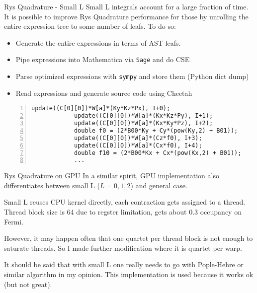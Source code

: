 \documentclass{beamer}
\begin{document}
\begin{frame}[fragile]{Rys Quadrature - Small L}
Small L integrals account for a large fraction of time.
It is possible to improve Rys Quadrature performance for those by
unrolling the entire expression tree to some number of leafs.
To do so:
\begin{itemize}
\item Generate the entire expressions in terms of AST leafs.
\item Pipe expressions into Mathematica via {\tt Sage} and do CSE
\item Parse optimized expressions with {\tt sympy} and store them (Python dict dump)
\item Read expressions and generate source code using Cheetah
\end{itemize}

\begin{lstlisting}[caption=Small L generated snippet, numbers=left]
            update((C[0][0])*W[a]*(Ky*Kz*Px), I+0);
            update((C[0][0])*W[a]*(Kx*Kz*Py), I+1);
            update((C[0][0])*W[a]*(Kx*Ky*Pz), I+2);
            double f0 = (2*B00*Ky + Cy*(pow(Ky,2) + B01));
            update((C[0][0])*W[a]*(Cz*f0), I+3);
            update((C[0][0])*W[a]*(Cx*f0), I+4);
            double f10 = (2*B00*Kx + Cx*(pow(Kx,2) + B01));
            ...
\end{lstlisting}

\end{frame}



\begin{frame}{Rys Quadrature on GPU}
  In a similar spirit, GPU implementation also differentiates between
  small L ($L=0,1,2$) and general case.

  Small L  reuses CPU kernel directly, each contraction gets assigned
  to a thread.  Thread block size is 64 due to regster limitation,
  gets about 0.3 occupancy on Fermi.

  However, it may happen often that one quartet per thread block is
  not enough to saturate threads.  So I made further modification
  where it is quartet per warp.

  It should be said that with small L one really needs to go with
  Pople-Hehre or similar algorithm in my opinion.  This implementation
  is used because it works ok (but not great).

\end{frame}
\end{document}
